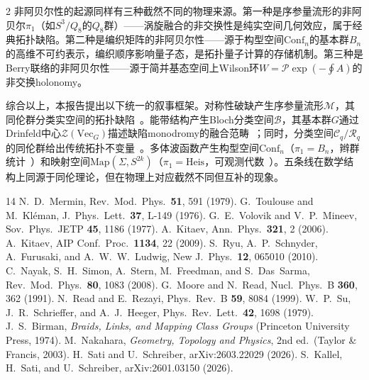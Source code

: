 \documentclass[a4paper,11pt]{ctexart}
\begin{document}
\begin{multicols}{2}
非阿贝尔性的起源同样有三种截然不同的物理来源。第一种是序参量流形的非阿贝尔$\pi_1$（如$S^3/Q_8$的$Q_8$群）——涡旋融合的非交换性是纯实空间几何效应，属于经典拓扑缺陷。第二种是编织矩阵的非阿贝尔性——源于构型空间$\mathrm{Conf}_n$的基本群$B_n$的高维不可约表示，编织顺序影响量子态，是拓扑量子计算的存储机制。第三种是Berry联络的非阿贝尔性——源于简并基态空间上Wilson环$W=\mathcal{P}\exp(-\oint A)$的非交换holonomy。

综合以上，本报告提出以下统一的叙事框架。对称性破缺产生序参量流形$\mathcal{M}$，其同伦群分类实空间的拓扑缺陷~\cite{Mermin1979,Toulouse1976,Volovik1977}。能带结构产生Bloch分类空间$\mathcal{B}$，其基本群$G$通过Drinfeld中心$\mathcal{Z}(\mathrm{Vec}_G)$描述缺陷monodromy的融合范畴~\cite{Sati2026Drinfeld}；同时，分类空间$\mathcal{C}_q/\mathcal{R}_q$的同伦群给出传统拓扑不变量~\cite{Kitaev2009,Ryu2010}。多体波函数产生构型空间$\mathrm{Conf}_n$（$\pi_1=B_n$，辫群统计~\cite{Birman1974}）和映射空间$\mathrm{Map}(\Sigma,S^{2k})$（$\pi_1=\mathrm{Heis}$，可观测代数~\cite{Kallel2026Anyons}）。五条线在数学结构上同源于同伦理论，但在物理上对应截然不同但互补的现象。

\end{multicols}

\begin{thebibliography}{14}
 N.~D.~Mermin, Rev.~Mod.~Phys.\ \textbf{51}, 591 (1979).
 G.~Toulouse and M.~Kl\'eman, J.~Phys.~Lett.\ \textbf{37}, L-149 (1976).
 G.~E.~Volovik and V.~P.~Mineev, Sov.~Phys.~JETP \textbf{45}, 1186 (1977).
 A.~Kitaev, Ann.~Phys.\ \textbf{321}, 2 (2006).
 A.~Kitaev, AIP Conf.~Proc.\ \textbf{1134}, 22 (2009).
 S.~Ryu, A.~P.~Schnyder, A.~Furusaki, and A.~W.~W.~Ludwig, New J.~Phys.\ \textbf{12}, 065010 (2010).
 C.~Nayak, S.~H.~Simon, A.~Stern, M.~Freedman, and S.~Das~Sarma, Rev.~Mod.~Phys.\ \textbf{80}, 1083 (2008).
 G.~Moore and N.~Read, Nucl.~Phys.~B \textbf{360}, 362 (1991).
 N.~Read and E.~Rezayi, Phys.~Rev.~B \textbf{59}, 8084 (1999).
 W.~P.~Su, J.~R.~Schrieffer, and A.~J.~Heeger, Phys.~Rev.~Lett.\ \textbf{42}, 1698 (1979).
 J.~S.~Birman, \textit{Braids, Links, and Mapping Class Groups} (Princeton University Press, 1974).
 M.~Nakahara, \textit{Geometry, Topology and Physics}, 2nd ed.\ (Taylor \& Francis, 2003).
 H.~Sati and U.~Schreiber, arXiv:2603.22029 (2026).
 S.~Kallel, H.~Sati, and U.~Schreiber, arXiv:2601.03150 (2026).
\end{thebibliography}
\end{document}
